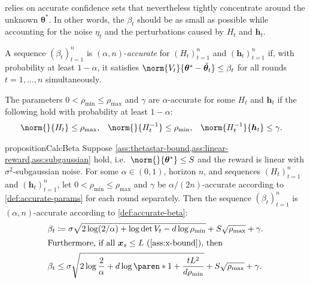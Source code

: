 \documentclass{article}
\renewcommand{\vec}[1]{\bm{#1}}
\newcommand{\defeq}{\coloneq}
\newcommand{\inv}[1]{#1^{-1}}
\DeclarePairedDelimiter{\paren}()
\begin{document}
 relies on accurate confidence sets that nevertheless
tightly concentrate around the unknown $\vec\theta^*$.  In other
words, the $\beta_t$ should be as small as possible while accounting
for the noise $\eta_t$ and the perturbations caused by $H_t$ and
$\vec h_t$.

\begin{definition}\label{def:accurate-beta}
  A sequence $(\beta_t)_{t=1}^n$ is $(\alpha, n)$-\emph{accurate} for
  $(H_t)_{t=1}^n$ and $(\vec h_t)_{t=1}^n$ if, with probability at
  least $1-\alpha$, it satisfies
  $\norm{V_t}{\vec\theta^* - \tilde{\vec\theta}_t} \le \beta_t$
  for all rounds $t=1,\dotsc,n$ simultaneously.
\end{definition}

\begin{definition}\label{def:accurate-params}
  The parameters $0 < \rho_{\min} \le \rho_{\max}$ and $\gamma$ are
  $\alpha$-accurate for some $H_t$ and $\vec h_t$ if the following hold
  with probability at least $1-\alpha$:
  \begin{align*}
    \norm{}{H_t} &\le \rho_{\max},
    &\norm{}{\inv{H_t}} &\le \rho_{\min},
    &\norm{\inv{H_t}}{\vec h_t} &\le \gamma.
  \end{align*}
\end{definition}

\begin{restatable}{proposition}{CalcBeta}%
  \label{prop:calc-beta}
  Suppose \cref{ass:thetastar-bound,ass:linear-reward,ass:subgaussian}
  hold, i.e.\ $\norm{}{\vec\theta^*} \le S$ and the reward is linear
  with $\sigma^2$-subgaussian noise.  For some $\alpha\in(0,1)$,
  horizon $n$, and sequences $(H_t)_{t=1}^n$ and $(\vec h_t)_{t=1}^n$,
  let $0 < \rho_{\min} \le \rho_{\max}$ and $\gamma$ be
  $\alpha/(2n)$-accurate according to \cref{def:accurate-params} for
  each round separately.  Then the sequence $(\beta_t)_{t=1}^n$ is
  $(\alpha,n)$-accurate according to \cref{def:accurate-beta}:
  \begin{align*}
    \beta_t &\defeq \sigma\sqrt{2\log(2/\alpha) + \log\det V_t - d\log\rho_{\min}}
             + S\sqrt{\rho_{\max}} + \gamma. \\
    \shortintertext{Furthermore, if all $\vec x_s \le L$
    (\cref{ass:x-bound}), then}
    \beta_t &\le \sigma\sqrt{2\log\frac{2}{\alpha} + d\log\paren*{1 + \frac{tL^2}{d\rho_{\min}}}}
             + S\sqrt{\rho_{\max}} + \gamma.
  \end{align*}
\end{restatable}
\end{document}
